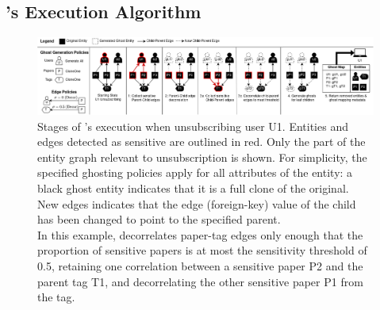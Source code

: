 \subsection{\sys's Execution Algorithm}
\begin{figure}[ht!]
    \centering
    \includegraphics[width=\textwidth]{img/algo}

    \caption{Stages of \sys's execution when unsubscribing user U1. Entities and edges detected as
    sensitive are outlined in red. Only the part of the entity graph relevant to unsubscription is shown.
    For simplicity, the specified ghosting policies apply for all attributes
    of the entity: a black ghost entity indicates that it is a full clone of the original.
    New edges indicates that the edge (foreign-key) value of the child has been changed to
    point to the specified parent.\\
    In this example, \sys decorrelates paper-tag edges only enough that the proportion of sensitive papers
    is at most the sensitivity threshold of 0.5, retaining one correlation between a sensitive
    paper P2 and the parent tag T1, and decorrelating the other sensitive paper P1 from the tag.}
    \label{fig:algo}
\end{figure}


